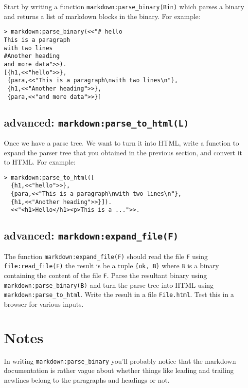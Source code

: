 \documentclass[12pt]{hitec}
\begin{document}
Start by writing a function \verb+markdown:parse_binary(Bin)+ which
parses a binary and returns a list of markdown blocks in the
binary. For example:

\begin{Verbatim}[frame=single]
> markdown:parse_binary(<<"# hello
This is a paragraph
with two lines
#Another heading
and more data">>).
[{h1,<<"hello">>},
 {para,<<"This is a paragraph\nwith two lines\n"},
 {h1,<<"Another heading">>},
 {para,<<"and more data">>}]
\end{Verbatim}

\subsection{advanced: \texttt{markdown:parse\_to\_html(L)}}

Once we have a parse tree. We want to turn it into HTML, write a
function to expand the parser tree that you obtained in the previous
section, and convert it to HTML. For example:

\begin{Verbatim}[frame=single]
> markdown:parse_to_html([
  {h1,<<"hello">>},
  {para,<<"This is a paragraph\nwith two lines\n"},
  {h1,<<"Another heading">>}]).
  <<"<h1>Hello</h1><p>This is a ...">>.
\end{Verbatim}

\subsection{advanced: \texttt{markdown:expand\_file(F)}}

The function \verb+markdown:expand_file(F)+ should read the file
\verb+F+ using\\
\verb+file:read_file(F)+ the result is be a tuple
\verb+{ok, B}+ where \verb+B+ is a binary containing the content of
the file \verb+F+. Parse the resultant binary using
\verb+markdown:parse_binary(B)+ and turn the parse tree into HTML using
\verb+markdown:parse_to_html+. Write the result in a file
\verb+File.html+. Test this in a browser for various inputs.

\section{Notes}

In writing \verb+markdown:parse_binary+ you'll probably notice that the
markdown documentation is rather vague about whether things like leading
and trailing newlines belong to the paragraphs and headings or not.
\end{document}
